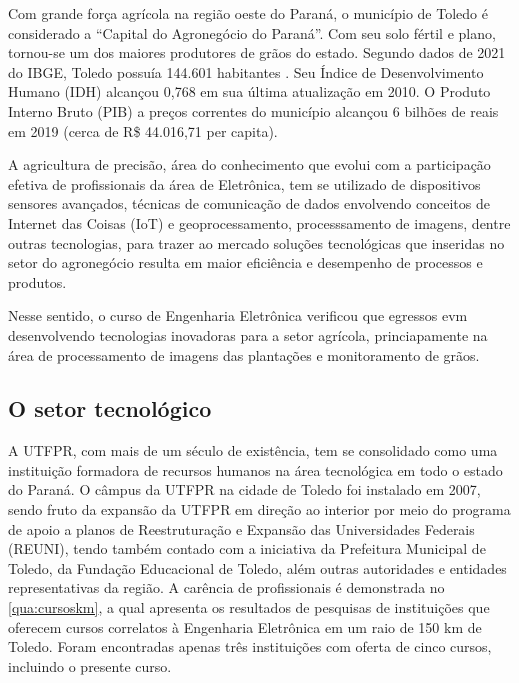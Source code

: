 Com grande força agrícola na região oeste do Paraná, o município de Toledo é considerado a ``Capital do Agronegócio do Paraná''. Com seu solo fértil e plano, tornou-se um dos maiores produtores de grãos do estado. Segundo dados de 2021 do IBGE, Toledo possuía 144.601 habitantes \cite{ibge2020}. Seu Índice de Desenvolvimento Humano (IDH) alcançou 0,768 em sua última atualização em 2010. O Produto Interno Bruto (PIB) a preços correntes do município alcançou 6 bilhões de reais em 2019 (cerca de R\$ 44.016,71 per capita). 


A agricultura de precisão, área do conhecimento que evolui com a participação efetiva de profissionais da área de Eletrônica, tem se utilizado de dispositivos sensores avançados, técnicas de comunicação de dados envolvendo conceitos de Internet das Coisas (IoT) e geoprocessamento, processsamento de imagens, dentre outras tecnologias, para trazer ao mercado soluções tecnológicas que inseridas no setor do agronegócio resulta em maior eficiência e desempenho de processos e produtos. 

Nesse sentido, o curso de Engenharia Eletrônica verificou que egressos evm desenvolvendo tecnologias inovadoras para a setor agrícola, princiapamente na área de processamento de imagens das plantações e monitoramento de grãos.

\subsection{O setor tecnológico}

A UTFPR, com mais de um século de existência, tem se consolidado como uma instituição formadora de recursos humanos na área tecnológica em todo o estado do Paraná. O câmpus da UTFPR na cidade de Toledo foi instalado em 2007, sendo fruto da expansão da UTFPR em direção ao interior por meio do programa de apoio a planos de Reestruturação e Expansão das Universidades Federais (REUNI), tendo também contado com a iniciativa da Prefeitura Municipal de Toledo, da Fundação Educacional de Toledo, além outras autoridades e entidades representativas da região. A carência de profissionais é demonstrada no \autoref{qua:cursoskm}, a qual apresenta os resultados de pesquisas de instituições que oferecem cursos correlatos à Engenharia Eletrônica em um raio de 150 km de Toledo. Foram encontradas apenas três instituições com oferta de cinco cursos, incluindo o presente curso.

